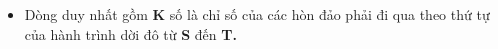 \begin{itemize}
	\item Dòng duy nhất gồm \textbf{ K } số là chỉ số của các hòn đảo phải đi qua theo thứ tự của hành trình dời đô từ \textbf{ S } đến \textbf{ T. }
\end{itemize}